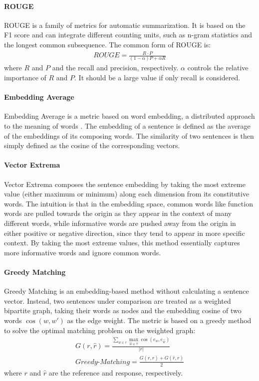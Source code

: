 \documentclass[conference]{IEEEtran}
\begin{document}
\paragraph{ROUGE}
ROUGE \cite{ROUGE} is a family of metrics for automatic summarization. It is based on the F1 score and can integrate different counting units, such as n-gram statistics and the longest common subsequence. The common form of ROUGE is:
\begin{align}
    \textit{ROUGE} = \frac{
    R \cdot P
    }{(1 - \alpha) P + \alpha R}
\end{align}
where $R$ and $P$ and the recall and precision, respectively. $\alpha$ controls the relative importance of $R$ and $P$. It should be a large value if only recall is considered.

\paragraph{Embedding Average}
Embedding Average is a metric based on word embedding, a distributed approach to the meaning of words \cite{word2vec}. The embedding of a sentence is defined as the average of the embeddings of its composing words. The similarity of two sentences is then simply defined as the cosine of the corresponding vectors.

\paragraph{Vector Extrema}
Vector Extrema \cite{Vector_Extrema} composes the sentence embedding by taking the most extreme value (either maximum or minimum) along each dimension from its constitutive words. The intuition is that in the embedding space, common words like function words are pulled towards the origin as they appear in the context of many different words, while informative words are pushed away from the origin in either positive or negative direction, since they tend to appear in more specific context. By taking the most extreme values, this method essentially captures more informative words and ignore common words.

\paragraph{Greedy Matching}
Greedy Matching \cite{GreedyAndOptimal} is an embedding-based method without calculating a sentence vector. Instead, two sentences under comparison are treated as a weighted bipartite graph, taking their words as nodes and the embedding cosine of two words $\cos(w, w')$ as the edge weight. The metric is based on a greedy method to solve the optimal matching problem on the weighted graph:
\begin{align}
    G(r, \hat{r}) = \frac{
    \sum_{w \in r} \max_{\hat{w} \in \hat{r}} \cos(e_w, e_{\hat{w}})
    }{ |r| } \\
    \textit{Greedy-Matching} = \frac{
    G(r, \hat{r}) + G(\hat{r}, r)
    }{2}
\end{align}
where $r$ and $\hat{r}$ are the reference and response, respectively.
\end{document}
